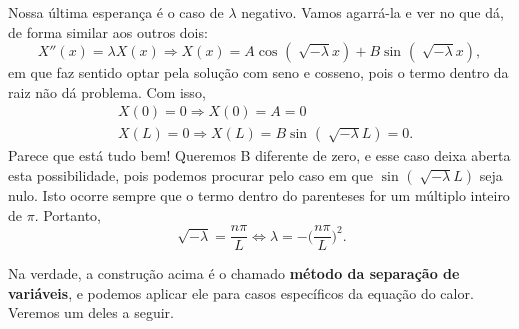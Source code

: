\documentclass[../pde_notes.tex]{subfiles}
\begin{document}
Nossa última esperança é o caso de \(\lambda \) negativo. Vamos agarrá-la e ver no que dá, de forma similar aos outros dois:
\[
	X''(x) = \lambda X(x) \Rightarrow X(x)=A\cos^{}{(\sqrt[]{-\lambda }x)} + B\sin^{}{(\sqrt[]{-\lambda }x)},
\]
em que faz sentido optar pela solução com seno e cosseno, pois o termo dentro da raiz não dá problema. Com isso,
\begin{align*}
	 & X(0)=0 \Rightarrow X(0)=A=0                                \\
	 & X(L)=0 \Rightarrow X(L)=B\sin^{}{(\sqrt[]{-\lambda }L)}=0.
\end{align*}
Parece que está tudo bem! Queremos B diferente de zero, e esse caso deixa aberta esta possibilidade, pois podemos procurar pelo caso em que \(\sin^{}{(\sqrt[]{-\lambda }L)}\) seja nulo. Isto ocorre sempre que o termo dentro do parenteses for um múltiplo inteiro de \(\pi \). Portanto,
\[
	\sqrt[]{-\lambda }=\frac{n\pi }{L} \Longleftrightarrow \lambda = -\biggl(\frac{n\pi }{L}\biggr)^{2}.
\]

Na verdade, a construção acima é o chamado \textbf{método da separação de variáveis}, e podemos aplicar ele para casos específicos da equação do calor. Veremos um deles a seguir.
\end{document}
